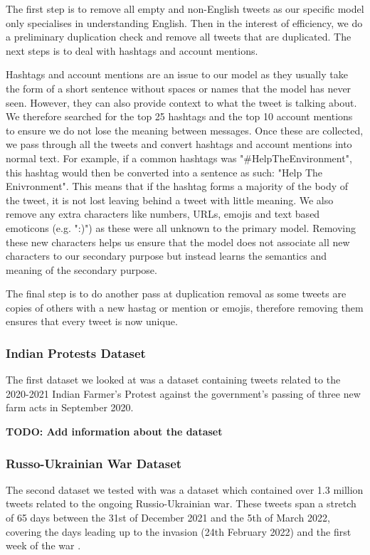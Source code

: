 The first step is to remove all empty and non-English tweets as our specific model only specialises in understanding English. Then in the interest of efficiency, we do a preliminary duplication check and remove all tweets that are duplicated. The next steps is to deal with hashtags and account mentions.

Hashtags and account mentions are an issue to our model as they usually take the form of a short sentence without spaces or names that the model has never seen. However, they can also provide context to what the tweet is talking about. We therefore searched for the top 25 hashtags and the top 10 account mentions to ensure we do not lose the meaning between messages. Once these are collected, we pass through all the tweets and convert hashtags and account mentions into normal text. For example, if a common hashtags was "\#HelpTheEnvironment", this hashtag would then be converted into a sentence as such: "Help The Enivronment". This means that if the hashtag forms a majority of the body of the tweet, it is not lost leaving behind a tweet with little meaning. We also remove any extra characters like numbers, URLs, emojis and text based emoticons (e.g. ":)") as these were all unknown to the primary model. Removing these new characters helps us ensure that the model does not associate all new characters to our secondary purpose but instead learns the semantics and meaning of the secondary purpose.

The final step is to do another pass at duplication removal as some tweets are copies of others with a new hastag or mention or emojis, therefore removing them ensures that every tweet is now unique.

\subsubsection{Indian Protests Dataset}
The first dataset we looked at was a dataset containing tweets related to the 2020-2021 Indian Farmer's Protest against the government's passing of three new farm acts in September 2020.

\textbf{TODO: Add information about the dataset}

\subsubsection{Russo-Ukrainian War Dataset}

The second dataset we tested with was a dataset which contained over 1.3 million tweets related to the ongoing Russio-Ukrainian war. These tweets span a stretch of 65 days between the 31st of December 2021 and the 5th of March 2022, covering the days leading up to the invasion (24th February 2022) and the first week of the war \cite{ukraine-war-dataset}.

